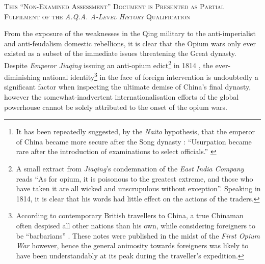 \documentclass[a4paper,oneside]{article}
\newcommand{\textrule}{%
        \noindent
        \makebox[\linewidth]{
                \rule{\linewidth}{0.4pt}
        }%
}
\begin{document}
\begin{abstract}
        This essay will discuss the factors which led to the downfall of the
        greatest dynasty\footnote{It has been repeatedly suggested, by the
        \textit{Naito} hypothesis, that the emperor of China became more secure
        after the Song dynasty \autocite{Miyakawa:1955}: ``Usurpation became
        rare after the introduction of examinations to select officials.''
        \autocite{Sng:2014}} in the history of China. Also under examination
        will be the extent to which the strained international trade relations
        with the \textit{East India Company} and the ensuing Opium wars
        contributed to the ultimate demise of 1912.
\end{abstract}

\textrule%
\vspace*{0.6em}
{
        \centering \textsc{This ``Non-Examined Assessment'' Document is
        Presented as Partial Fulfilment of the \textit{A.Q.A. A-Level History}
        Qualification}\\
}
\textrule%
\vspace*{0.6em}

From the exposure of the weaknesses in the Qing military to the
anti-imperialist and anti-feudalism domestic rebellions, it is clear that the
Opium wars only ever existed as a subset of the immediate issues threatening
the Great dynasty.  Despite \textit{Emperor Jiaqing} issuing an anti-opium
edict\footnote{A small extract from \textit{Jiaqing}'s condemnation of the
\textit{East India Company} reads ``As for opium, it is poisonous to the
greatest extreme, and those who have taken it are all wicked and unscrupulous
without exception''. Speaking in 1814, it is clear that his words had little
effect on the actions of the traders.} in 1814 \autocite{Hu:1991}, the
ever-diminishing national identity\footnote{According to contemporary British
travellers to China, a true Chinaman often despised all other nations than his
own, while considering foreigners to be ``barbarians''
\autocite{McPherson:1842}.  These notes were published in the midst of the
\textit{First Opium War} however, hence the general animosity towards
foreigners was likely to have been understandably at its peak during the
traveller's expedition.} in the face of foreign intervention is undoubtedly a
significant factor when inspecting the ultimate demise of China's final
dynasty, however the somewhat-inadvertent internationalisation efforts of the
global powerhouse cannot be solely attributed to the onset of the opium wars.
\end{document}

